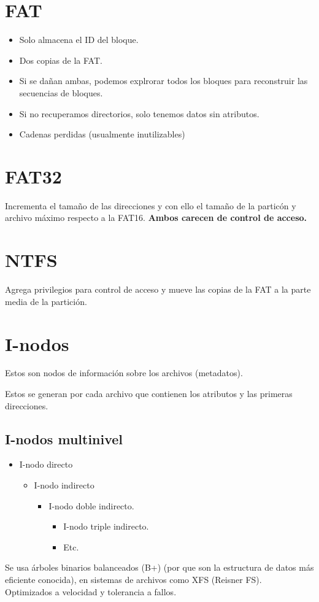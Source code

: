 \newpage
\chapter{FAT}
\begin{itemize}
	\item Solo almacena el ID del bloque.
	\item Dos copias de la FAT.
	\item Si se da\~{n}an ambas, podemos explrorar todos los bloques para reconstruir las secuencias de bloques.
	\item Si no recuperamos directorios, solo tenemos datos sin atributos.
	\item Cadenas perdidas (usualmente inutilizables)
\end{itemize}

\chapter{FAT32}
Incrementa el tama\~{n}o de las direcciones y con ello el tama\~{n}o de la partic\'{o}n y archivo m\'{a}ximo respecto a la FAT16.
\textbf{Ambos carecen de control de acceso.}

\chapter{NTFS}
Agrega privilegios para control de acceso y mueve las copias de la FAT a la parte media de la partici\'{o}n.

\chapter{I-nodos}
Estos son nodos de informaci\'{o}n sobre los archivos (metadatos).

Estos se generan por cada archivo que contienen los atributos y las primeras direcciones.

\section{I-nodos multinivel}
\begin{itemize}
	\item I-nodo directo
	\begin{itemize}
		\item I-nodo indirecto
		\begin{itemize}
			\item I-nodo doble indirecto.
			\begin{itemize}
				\item I-nodo triple indirecto.
				\item Etc.
			\end{itemize}
		\end{itemize}
	\end{itemize}
\end{itemize}
Se usa \'{a}rboles binarios balanceados (B+) (por que son la estructura de datos m\'{a}s eficiente conocida), en sistemas de archivos como XFS (Reisner FS).\\
Optimizados a velocidad y tolerancia a fallos.\\

